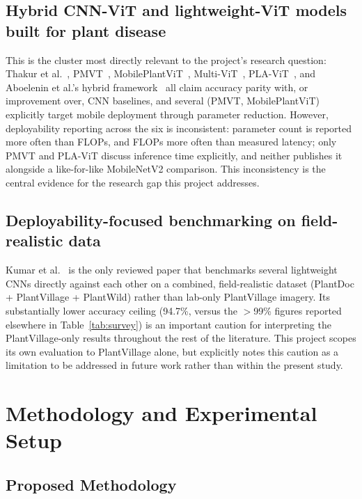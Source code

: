 \documentclass[conference]{IEEEtran}
\begin{document}
\subsection{Hybrid CNN-ViT and lightweight-ViT models built for plant disease}

This is the cluster most directly relevant to the project's research question: Thakur et al.~\cite{thakur2023vitcnn}, PMVT~\cite{li2023pmvt}, MobilePlantViT~\cite{tonmoy2025mobileplantvit}, Multi-ViT~\cite{baek2025multivit}, PLA-ViT~\cite{murugavalli2025plavit}, and Aboelenin et al.'s hybrid framework~\cite{aboelenin2025hybrid} all claim accuracy parity with, or improvement over, CNN baselines, and several (PMVT, MobilePlantViT) explicitly target mobile deployment through parameter reduction. However, deployability reporting across the six is inconsistent: parameter count is reported more often than FLOPs, and FLOPs more often than measured latency; only PMVT and PLA-ViT discuss inference time explicitly, and neither publishes it alongside a like-for-like MobileNetV2 comparison. This inconsistency is the central evidence for the research gap this project addresses.

\subsection{Deployability-focused benchmarking on field-realistic data}

Kumar et al.~\cite{kumar2025mobilefriendly} is the only reviewed paper that benchmarks several lightweight CNNs directly against each other on a combined, field-realistic dataset (PlantDoc + PlantVillage + PlantWild) rather than lab-only PlantVillage imagery. Its substantially lower accuracy ceiling (94.7\%, versus the $>$99\% figures reported elsewhere in Table~\ref{tab:survey}) is an important caution for interpreting the PlantVillage-only results throughout the rest of the literature. This project scopes its own evaluation to PlantVillage alone, but explicitly notes this caution as a limitation to be addressed in future work rather than within the present study.

\FloatBarrier

\section{Methodology and Experimental Setup}
\label{sec:method}

\subsection{Proposed Methodology}
\label{sec:method-overview}
\end{document}
